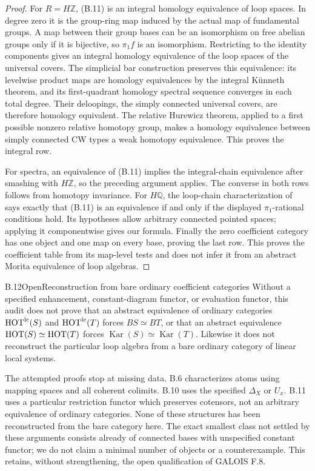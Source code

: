 \begin{proof}
For $R=H\mathbb Z$, (B.11) is an integral homology equivalence of loop
spaces. In degree zero it is the group-ring map induced by the actual
map of fundamental groups. A map between their group bases can be an
isomorphism on free abelian groups only if it is bijective, so
$\pi_1f$ is an isomorphism. Restricting to the identity components gives
an integral homology equivalence of the loop spaces of the universal
covers. The simplicial bar construction preserves this equivalence:
its levelwise product maps are homology equivalences by the integral
K\"unneth theorem, and its first-quadrant homology spectral sequence
converges in each total degree. Their deloopings, the simply connected
universal covers, are therefore homology equivalent. The relative
Hurewicz theorem, applied to a first possible nonzero relative homotopy
group, makes a homology equivalence between simply connected CW types
a weak homotopy equivalence. This proves the integral row.

For spectra, an equivalence of (B.11) implies the integral-chain
equivalence after smashing with $H\mathbb Z$, so the preceding argument
applies. The converse in both rows follows from homotopy invariance.
For $H\mathbb Q$, the loop-chain characterization of
\citet[Theorem 3]{RWZ2021} says exactly that (B.11) is an equivalence
if and only if the displayed $\pi_1$-rational conditions hold. Its
hypotheses allow arbitrary connected pointed spaces; applying it
componentwise gives our formula. Finally the zero coefficient category
has one object and one map on every base, proving the last row.
This proves the coefficient table from its map-level tests and does not
infer it from an abstract Morita equivalence of loop algebras.
\end{proof}

\begin{statement}{B.12}{Open}{Reconstruction from bare ordinary coefficient categories}
Without a specified enhancement, constant-diagram functor, or evaluation
functor, this audit does not prove that an abstract equivalence of
ordinary categories $\mathrm{HOT}^{\mathrm{lc}}(S)$ and $\mathrm{HOT}^{\mathrm{lc}}(T)$ forces
$BS\simeq BT$, or that an abstract equivalence $\mathrm{HOT}(S)\simeq\mathrm{HOT}(T)$
forces $\operatorname{Kar}(S)\simeq\operatorname{Kar}(T)$. Likewise it
does not reconstruct the particular loop algebra from a bare ordinary
category of linear local systems.
\end{statement}
The attempted proofs stop at missing data. B.6 characterizes atoms using
mapping spaces and all coherent colimits. B.10 uses the specified
$\Delta_X$ or $U_x$. B.11 uses a particular restriction functor which
preserves cotensors, not an arbitrary equivalence of ordinary
categories. None of these structures has been reconstructed from the
bare category here. The exact smallest class not settled by these
arguments consists already of connected bases with unspecified
constant functor; we do not claim a minimal number of objects or a
counterexample. This retains, without strengthening, the open
qualification of GALOIS F.8.
